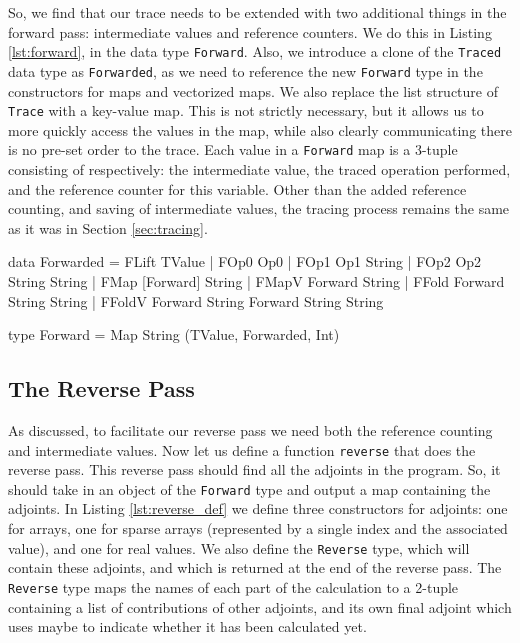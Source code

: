     So, we find that our trace needs to be extended with two additional things in the forward pass: intermediate values and reference counters.
    We do this in Listing \ref{lst:forward}, in the data type \texttt{Forward}.
    Also, we introduce a clone of the \texttt{Traced} data type as \texttt{Forwarded}, as we need to reference the new \texttt{Forward} type in the constructors for maps and vectorized maps.
    We also replace the list structure of \texttt{Trace} with a key-value map.
    This is not strictly necessary, but it allows us to more quickly access the values in the map, while also clearly communicating there is no pre-set order to the trace.
    Each value in a \texttt{Forward} map is a 3-tuple consisting of respectively: the intermediate value, the traced operation performed, and the reference counter for this variable.
    Other than the added reference counting, and saving of intermediate values, the tracing process remains the same as it was in Section \ref{sec:tracing}.

    \begin{haskell}[caption=Forward pass data structures, label=lst:forward, gobble=8]
        data Forwarded
            = FLift TValue
            | FOp0   Op0
            | FOp1   Op1       String
            | FOp2   Op2       String String
            | FMap   [Forward] String
            | FMapV  Forward   String
            | FFold  Forward   String String
            | FFoldV Forward   String Forward String String

        type Forward = Map String (TValue, Forwarded, Int)
    \end{haskell}

    \subsection{The Reverse Pass}
        As discussed, to facilitate our reverse pass we need both the reference counting and intermediate values.
        Now let us define a function \texttt{reverse} that does the reverse pass.
        This reverse pass should find all the adjoints in the program.
        So, it should take in an object of the \texttt{Forward} type and output a map containing the adjoints.
        In Listing \ref{lst:reverse_def} we define three constructors for adjoints: one for arrays, one for sparse arrays (represented by a single index and the associated value), and one for real values.
        We also define the \texttt{Reverse} type, which will contain these adjoints, and which is returned at the end of the reverse pass.
        The \texttt{Reverse} type maps the names of each part of the calculation to a 2-tuple containing a list of contributions of other adjoints, and its own final adjoint which uses maybe to indicate whether it has been calculated yet.

